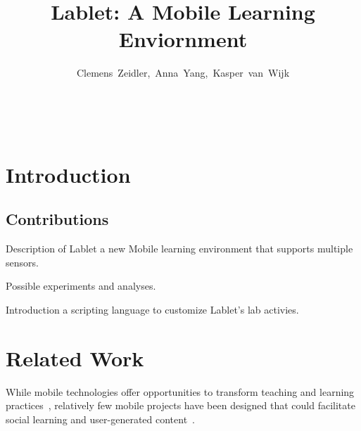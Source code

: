\documentclass{sigchi}
\begin{document}
\title{Lablet: A Mobile Learning Enviornment}


\author{
	\alignauthor \mbox{Clemens Zeidler, Anna Yang, Kasper van Wijk}\\
		\\
		\\
		\\
}

\maketitle


\begin{abstract}
\end{abstract}





\section{Introduction}

\subsection{Contributions}

\begin{itemize*}
\item Description of Lablet a new Mobile learning environment that supports multiple sensors.
\item Possible experiments and analyses.
\item Introduction a scripting language to customize Lablet's lab activies.
\end{itemize*}


\section{Related Work}
While mobile technologies offer opportunities to transform teaching and learning practices~\cite{karnad2014trends, Kukulska2010}, relatively few mobile projects have been designed that could facilitate social learning and user-generated content~\cite{Frohberg2009}.
\end{document}
